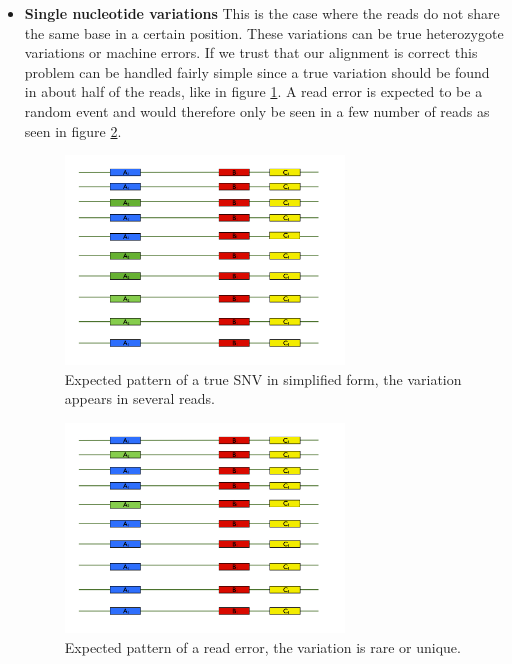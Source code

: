 \documentclass[a4paper,11pt]{kth-mag}
\begin{document}
\begin{itemize}
	\item \textbf{Single nucleotide variations}
	This is the case where the reads do not share the same base in a certain position. These variations can be true heterozygote variations or machine errors. If we trust that our alignment is correct this problem can be handled fairly simple since a true variation should be found in about half of the reads, like in figure \ref{fig:true_snv}. A read error is expected to be a random event and would therefore only be seen in a few number of reads as seen in figure \ref{fig:false_snv}.

	\begin{figure}[ht]
		\centering
			\includegraphics[width=0.7\textwidth]{../pictures/True_SNV.jpg}
		\caption{Expected pattern of a true SNV in simplified form, the variation appears in several reads.}
		\label{fig:true_snv}
	\end{figure}
	
	\begin{figure}[ht]
		\centering
			\includegraphics[width=0.7\textwidth]{../pictures/False_SNV.jpg}
		\caption{Expected pattern of a read error, the variation is rare or unique.}
		\label{fig:false_snv}
	\end{figure}
	

\end{itemize}
\end{document}
